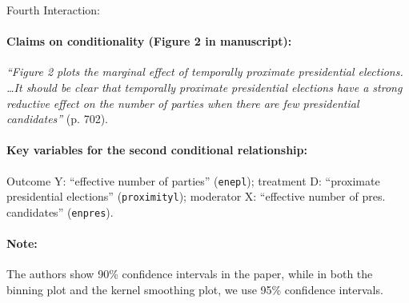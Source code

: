 \documentclass[12pt]{article}
\begin{document}
\clearpage

\noindent Fourth Interaction:


\paragraph{Claims on conditionality (Figure 2 in manuscript):} \emph{``Figure 2 plots the marginal effect of temporally proximate
  presidential elections. \ldots It should be clear that temporally
  proximate presidential elections have a strong reductive effect on
  the number of parties when there are few presidential candidates''} (p. 702).

\paragraph{Key variables for the second conditional relationship:} Outcome Y:
``effective number of parties'' (\texttt{enepl}); treatment D:  ``proximate presidential elections'' (\texttt{proximityl}); moderator X: ``effective number of pres. candidates'' (\texttt{enpres}). 

\paragraph{Note:} The authors show 90\% confidence intervals in the paper, while in both the binning plot and the kernel smoothing plot, we use 95\% confidence intervals.
\end{document}
